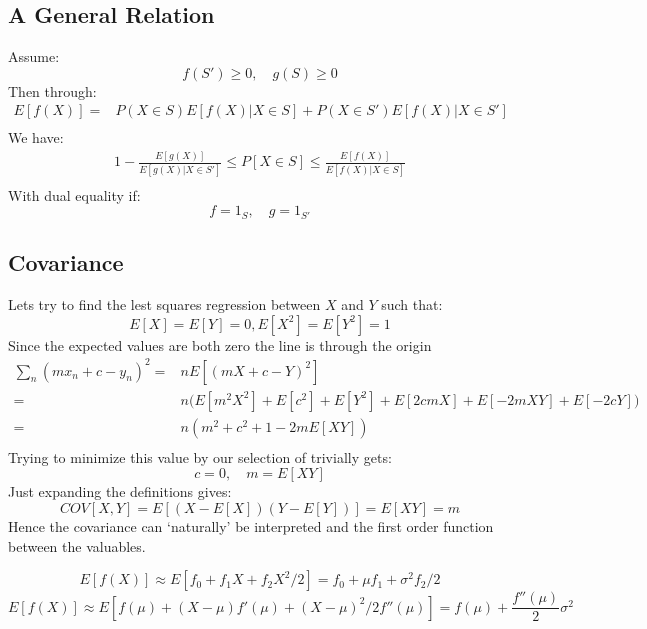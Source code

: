 \subsection*{A General Relation}
Assume:
\[f(S') \geq 0,\quad g(S) \geq 0\]
Then through:
\begin{equation*}
\begin{aligned}
	E[f(X)] =& P(X \in S)E[f(X) | X \in S] + P(X \in S' )E[f(X) | X \in S']\\
\end{aligned}
\end{equation*}
We have:
\begin{equation*}
\begin{aligned}
	1 - \frac{E[g(X)]}{E[g(X) | X \in S']} \leq P[X \in S] \leq \frac{E[f(X)]}{E[f(X) | X \in S]}\\
\end{aligned}
\end{equation*}
With dual equality if:
\[f = 1_S,\quad g = 1_{S'}\]

\subsection*{Covariance}
Lets try to find the lest squares regression between $X$ and $Y$ such that:
\[E[X] = E[Y] = 0, E[X^2] = E[Y^2] = 1\]
Since the expected values are both zero the line is through the origin
\begin{equation*}
\begin{aligned}
	\sum_{n}(mx_n+c-y_n)^2 =& nE[(mX+c-Y)^2] \\
	=& n \bigg(E[m^2X^2]+E[c^2]+E[Y^2]+E[2cmX]+E[-2mXY]+E[-2cY]\bigg)\\
	=& n(m^2+c^2+1-2mE[XY])\\
\end{aligned}
\end{equation*}
Trying to minimize this value by our selection of trivially gets:
\[c = 0,\quad m = E[XY]\]
Just expanding the definitions gives:
\[COV[X,Y] = E[(X-E[X])(Y-E[Y])] = E[XY] = m\]
Hence the covariance can `naturally' be interpreted and the first order function between the valuables.

\[E[f(X)] \approx E[f_0 + f_1X + f_2X^2/2] = f_0 + \mu f_1 + \sigma^2f_2/2\]
\[E[f(X)] \approx E[f(\mu) + (X-\mu)f'(\mu) + (X-\mu)^2/2f''(\mu)] = f(\mu) + \frac{f''(\mu)}{2}\sigma^2\]

